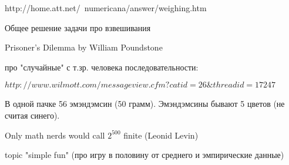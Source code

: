 http://home.att.net/~numericana/answer/weighing.htm \par
Общее решение задачи про взвешивания \par

Prisoner's Dilemma by William Poundstone\par

про "случайные" с т.зр. человека последовательности: \par
$http://www.wilmott.com/messageview.cfm?catid=26\&threadid=17247$ \par

В одной пачке 56 эмэндэмсин (50 грамм). Эмэндэмсины бывают 5 цветов (не считая синего). \par


Only math nerds would call $2^{500}$ finite (Leonid Levin) \par




topic "simple fun" (про игру в половину от среднего и эмпирические данные) \par





